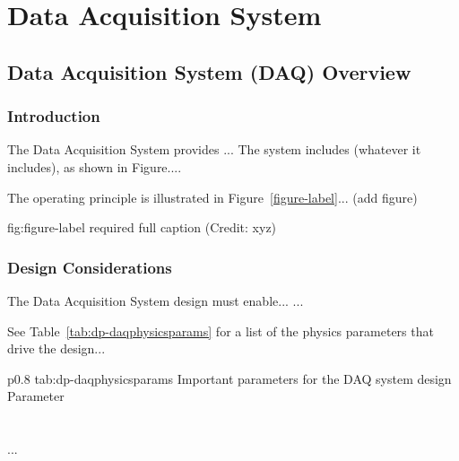\chapter{Data Acquisition System}
\label{ch:fddp-daq}

\section{Data Acquisition System (DAQ) Overview}
\label{sec:fddp-daq-ov}


\subsection{Introduction}
\label{sec:fddp-daq-intro}

The Data Acquisition System provides ...
The system includes (whatever it includes), as shown in Figure.... 


The operating principle is illustrated in Figure~\ref{figure-label}... (add figure)

\begin{dunefigure}{fig:figure-label}
{required full caption (Credit: xyz)}
\end{dunefigure}

\subsection{Design Considerations}
\label{sec:fddp-daq-des-consid}


The Data Acquisition System design must enable... 
...


See Table~\ref{tab:dp-daqphysicsparams} for a list of the physics parameters that drive the design...

\begin{dunetable}
{p{0.8\textwidth}}
{tab:dp-daqphysicsparams}
{Important parameters for the DAQ system design}   
Parameter  \\ \toprowrule
  \\ \colhline
   \\ \colhline
 ...\\ 
\end{dunetable}


